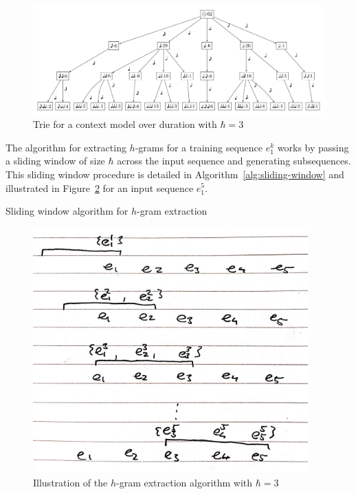 \documentclass[12pt,a4paper,twoside,openright]{report}
\begin{document}
\begin{figure}[H]
\centering
\includegraphics[width=455pt]{figs/duration_vp.pdf}
\caption{Trie for a context model over duration with $\hbar = 3$}
\label{fig:dur-trie}
\end{figure}

The algorithm for extracting $h$-grams for a training sequence $e_1^k$ works by
passing a sliding window of size $\hbar$ across the input sequence and
generating subsequences. This sliding window procedure is detailed in
Algorithm~\ref{alg:sliding-window} and illustrated in
Figure~\ref{fig:hgram-extract} for an input sequence $e_1^5$.

\begin{algorithm}[H]
  \caption{Sliding window algorithm for $h$-gram extraction}
  \label{alg:sliding-window}
  \begin{algorithmic}[1]
        \State {}
         
        \EndFor
      \EndFor
    \EndFunction
  \end{algorithmic}
\end{algorithm}

\begin{figure}[H]
\centering
\includegraphics[width=300pt]{figs/sliding_window_tmp.jpg}
\caption{Illustration of the $h$-gram extraction algorithm with $\hbar = 3$}
\label{fig:hgram-extract}
\end{figure}
\end{document}
